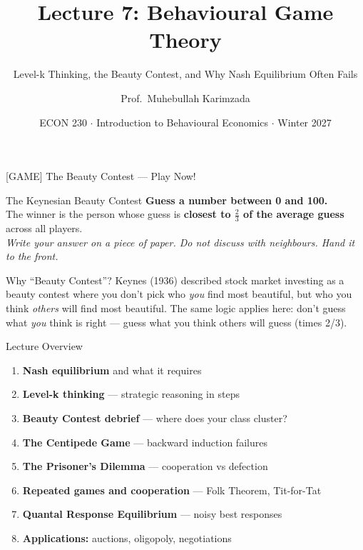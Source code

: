 \documentclass[aspectratio=169]{beamer}
\title{\textbf{Lecture 7: Behavioural Game Theory}}
\subtitle{Level-k Thinking, the Beauty Contest, and Why Nash Equilibrium Often Fails}
\author{Prof.\ Muhebullah Karimzada}
\institute{School of Economics, University of Northern British Columbia}
\date{ECON 230 $\cdot$ Introduction to Behavioural Economics $\cdot$ Winter 2027}
\begin{document}
\begin{frame}[plain]\titlepage\end{frame}

\begin{frame}{[GAME] The Beauty Contest --- Play Now!}
\begin{alertblock}{The Keynesian Beauty Contest}
\textbf{Guess a number between 0 and 100.}\\[0.3em]
The winner is the person whose guess is \textbf{closest to $\frac{2}{3}$ of the average guess} across all players.\\[0.4em]
\textit{Write your answer on a piece of paper. Do not discuss with neighbours. Hand it to the front.}
\end{alertblock}
\begin{block}{Why ``Beauty Contest''?}
Keynes (1936) described stock market investing as a beauty contest where you don't pick who \textit{you} find most beautiful, but who you think \textit{others} will find most beautiful. The same logic applies here: don't guess what \textit{you} think is right --- guess what you think others will guess (times 2/3).
\end{block}
\end{frame}

\begin{frame}{Lecture Overview}
\begin{enumerate}[<+->]
  \item \textbf{Nash equilibrium} and what it requires
  \item \textbf{Level-k thinking} --- strategic reasoning in steps
  \item \textbf{Beauty Contest debrief} --- where does your class cluster?
  \item \textbf{The Centipede Game} --- backward induction failures
  \item \textbf{The Prisoner's Dilemma} --- cooperation vs defection
  \item \textbf{Repeated games and cooperation} --- Folk Theorem, Tit-for-Tat
  \item \textbf{Quantal Response Equilibrium} --- noisy best responses
  \item \textbf{Applications:} auctions, oligopoly, negotiations
\end{enumerate}
\end{frame}
\end{document}
